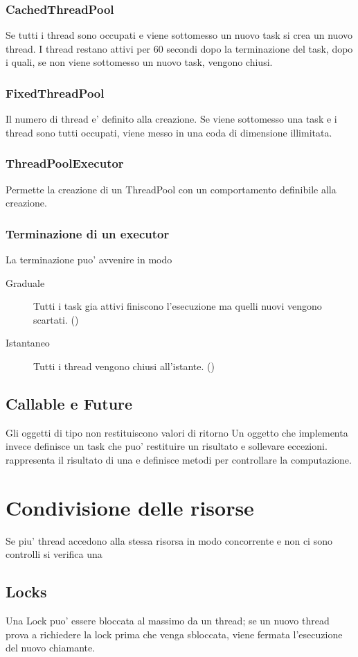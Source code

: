 \subsection{CachedThreadPool}
Se tutti i thread sono occupati e viene sottomesso un nuovo task si crea un nuovo thread.
I thread restano attivi per 60 secondi dopo la terminazione del task, dopo i quali, se non viene sottomesso un nuovo task, vengono chiusi.
\subsection{FixedThreadPool}
Il numero di thread e' definito alla creazione.
Se viene sottomesso una task e i thread sono tutti occupati, viene messo in una coda di dimensione illimitata.
\subsection{ThreadPoolExecutor}
Permette la creazione di un ThreadPool con un comportamento definibile alla creazione.
\subsection{Terminazione di un executor}
La terminazione puo' avvenire in modo
\begin{description}
    \item[Graduale] Tutti i task gia attivi finiscono l'esecuzione ma quelli nuovi vengono scartati. ()
    \item[Istantaneo] Tutti i thread vengono chiusi all'istante. ()
\end{description}
\section{Callable e Future}
Gli oggetti di tipo  non restituiscono valori di ritorno
Un oggetto che implementa  invece definisce un task che puo' restituire un risultato e sollevare eccezioni.
 rappresenta il risultato di una  e definisce metodi per controllare la computazione.
\chapter{Condivisione delle risorse}
Se piu' thread accedono alla stessa risorsa in modo concorrente e non ci sono controlli si verifica una 
\section{Locks}
Una Lock puo' essere bloccata al massimo da un thread; se un nuovo thread prova a richiedere la lock prima che venga sbloccata, viene fermata l'esecuzione del nuovo chiamante.
